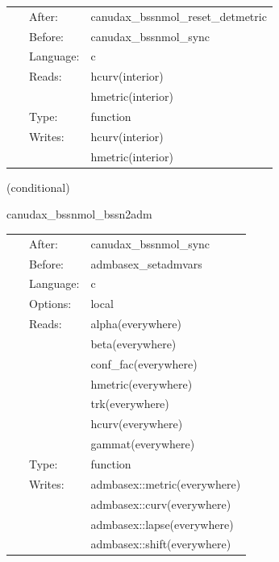\hspace{5mm}{\it remove trace of a } 


\hspace{5mm}

 \begin{tabular*}{160mm}{cll} 
~ & After:  & canudax\_bssnmol\_reset\_detmetric \\ 
~ & Before:  & canudax\_bssnmol\_sync \\ 
~ & Language:  & c \\ 
~ & Reads:  & hcurv(interior) \\ 
~& ~ &hmetric(interior)\\ 
~ & Type:  & function \\ 
~ & Writes:  & hcurv(interior) \\ 
~& ~ &hmetric(interior)\\ 
\end{tabular*} 


\vspace{5mm}

   (conditional) 

\hspace{5mm} canudax\_bssnmol\_bssn2adm 

\hspace{5mm}{\it convert variables back to the adm ones } 


\hspace{5mm}

 \begin{tabular*}{160mm}{cll} 
~ & After:  & canudax\_bssnmol\_sync \\ 
~ & Before:  & admbasex\_setadmvars \\ 
~ & Language:  & c \\ 
~ & Options:  & local \\ 
~ & Reads:  & alpha(everywhere) \\ 
~& ~ &beta(everywhere)\\ 
~& ~ &conf\_fac(everywhere)\\ 
~& ~ &hmetric(everywhere)\\ 
~& ~ &trk(everywhere)\\ 
~& ~ &hcurv(everywhere)\\ 
~& ~ &gammat(everywhere)\\ 
~ & Type:  & function \\ 
~ & Writes:  & admbasex::metric(everywhere) \\ 
~& ~ &admbasex::curv(everywhere)\\ 
~& ~ &admbasex::lapse(everywhere)\\ 
~& ~ &admbasex::shift(everywhere)\\ 
\end{tabular*} 


